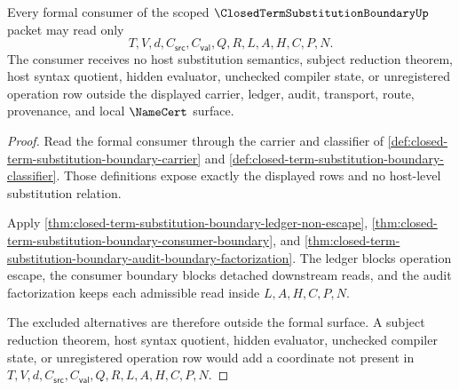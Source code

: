 \begin{theorem}
\label{thm:closed-term-substitution-boundary-formal-surface-exhaustion}
Every formal consumer of the scoped $\ClosedTermSubstitutionBoundaryUp$ packet may read only
$$
T,V,d,C_{\mathsf{src}},C_{\mathsf{val}},Q,R,L,A,H,C,P,N.
$$
The consumer receives no host substitution semantics, subject reduction theorem, host syntax quotient, hidden evaluator, unchecked compiler state, or unregistered operation row outside the displayed carrier, ledger, audit, transport, route, provenance, and local $\NameCert$ surface.
\end{theorem}
\begin{proof}
Read the formal consumer through the carrier and classifier of \autoref{def:closed-term-substitution-boundary-carrier} and \autoref{def:closed-term-substitution-boundary-classifier}. Those definitions expose exactly the displayed rows and no host-level substitution relation.

Apply \autoref{thm:closed-term-substitution-boundary-ledger-non-escape}, \autoref{thm:closed-term-substitution-boundary-consumer-boundary}, and \autoref{thm:closed-term-substitution-boundary-audit-boundary-factorization}. The ledger blocks operation escape, the consumer boundary blocks detached downstream reads, and the audit factorization keeps each admissible read inside $L,A,H,C,P,N$.

The excluded alternatives are therefore outside the formal surface. A subject reduction theorem, host syntax quotient, hidden evaluator, unchecked compiler state, or unregistered operation row would add a coordinate not present in $T,V,d,C_{\mathsf{src}},C_{\mathsf{val}},Q,R,L,A,H,C,P,N$.
\end{proof}

